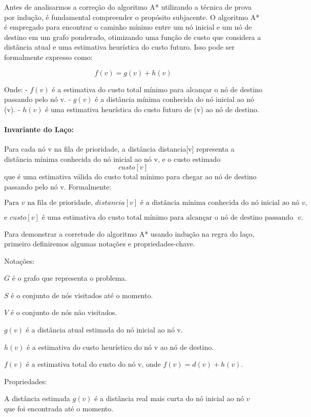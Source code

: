 Antes de analisarmos a correção do algoritmo A* utilizando a técnica de
prova por indução, é fundamental compreender o propósito subjacente. O
algoritmo A* é empregado para encontrar o caminho mínimo entre um nó
inicial e um nó de destino em um grafo ponderado, otimizando uma função
de custo que considera a distância atual e uma estimativa heurística do
custo futuro. Isso pode ser formalmente expresso como:

\[
f(v) = g(v) + h(v)
\]

Onde: - \(f(v)\) é a estimativa do custo total mínimo para alcançar o nó
de destino passando pelo nó v. - \(g(v)\) é a distância mínima conhecida
do nó inicial ao nó (v). - \(h(v)\) é uma estimativa heurística do custo
futuro de (v) ao nó de destino.

\paragraph{Invariante do Laço:}\label{invariante-do-lauxe7o}

Para cada nó v na fila de prioridade, a distância distancia{[}v{]}
representa a distância mínima conhecida do nó inicial ao nó v, e o custo
estimado \[
custo[v]
\] que é uma estimativa válida do custo total mínimo para chegar ao nó
de destino passando pelo nó v. Formalmente:

\[
\text{Para } v \text{ na fila de prioridade, } distancia[v] \text{ é a distância mínima conhecida do nó inicial ao nó } v,
\]

\[
\text{e } custo[v] \text{ é uma estimativa do custo total mínimo para alcançar o nó de destino passando por } v.
\]

Para demonstrar a corretude do algoritmo A* usando indução na regra do
laço, primeiro definiremos algumas notações e propriedades-chave.

Notações:

\(G\) é o grafo que representa o problema.

\(S\) é o conjunto de nós visitados até o momento.

\(V\) é o conjunto de nós não visitados.

\(g(v)\) é a distância atual estimada do nó inicial ao nó v.

\(h(v)\) é a estimativa do custo heurístico do nó v ao nó de destino.

\(f(v)\) é a estimativa total do custo do nó v, onde
\(f(v) = d(v) + h(v)\).

Propriedades:

A distância estimada \(g(v)\) é a distância real mais curta do nó
inicial ao nó \(v\) que foi encontrada até o momento.

